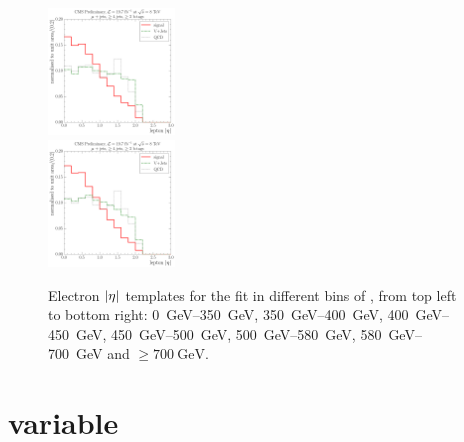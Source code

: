 \begin{figure}[!htbp]
    {\includegraphics[width=0.3\textwidth]{measurement/ST/central/fit_templates/muon_templates_bin_580-700}}\\
    {\includegraphics[width=0.3\textwidth]{measurement/ST/central/fit_templates/muon_templates_bin_700-inf}}
    \caption{Electron $\lvert \eta \rvert$ templates for the fit in different bins of \ST,
    from top left to bottom right: \SIrange{0}{350}{\GeV}, \SIrange{350}{400}{\GeV},
    \SIrange{400}{450}{\GeV}, \SIrange{450}{500}{\GeV}, \SIrange{500}{580}{\GeV},
    \SIrange{580}{700}{\GeV} and $\geq \SI{700}{\GeV}$.}
    \label{fig:fit_templates_ST_muon}
\end{figure}

\newpage
\section*{\WPT variable}

